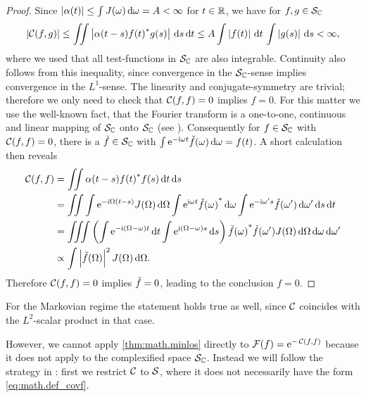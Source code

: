 \begin{lem}
  \label{lem:math.covf_sp}
\end{lem}
\begin{proof}
  Since $\left\vert \alpha(t) \right\vert \le \int J(\omega)\, \mathrm{d}\omega = A < \infty$ for $t\in\mathbb{R}$, we have for $f,g\in\mathcal{S}_{\mathbb{C}}$
  \begin{equation*}
    \abs{\varf(f,g)} \le \iint \abs{\alpha(t-s) \cc{f(t)} g(s)} \dd s \dd t
                     \le A \int\abs{f(t)}\dd t \, \int\abs{g(s)}\dd s 
                     < \infty,
  \end{equation*}
  where we used that all test-functions in $\mathcal{S}_{\mathbb{C}}$ are also integrable.
  Continuity also follows from this inequality, since convergence in the $\mathcal{S}_{\mathbb{C}}$-sense implies convergence in the $L^1$-sense.
  The linearity and conjugate-symmetry are trivial; therefore we only need to check that $\varf(f,f)=0$ implies $f=0$.
  For this matter we use the well-known fact, that the Fourier transform is a one-to-one, continuous and linear mapping of $\mathcal{S}_{\mathbb{C}}$ onto $\mathcal{S}_{\mathbb{C}}$ (see \cite[Theorem 7.7]{Ru91_functional_analysis}).
  Consequently for $f\in\mathcal{S}_{\mathbb{C}}$ with $\varf(f,f) = 0$, there is a $\check{f}\in\mathcal{S}_{\mathbb{C}}$ with $\int\exp[-\ii\omega t]\ift{f}(\omega)\dd\omega = f(t)$.
  A short calculation then reveals
  \begin{align*}
    \varf(f,f) & = \iint \alpha(t-s) \cc{f(t)} f(s) \dd t \dd s \\
               & = \iint  \int\exp[-\ii \Omega (t-s)]J(\Omega)\dd\Omega  \int\exp[\ii\omega t]\cc{\ift{f}(\omega)}\dd\omega  \int\exp[-\ii\omega' s]\ift{f}(\omega') \dd\omega'  \dd s \dd t \\
               & = \iiint \left(   \int \exp[-\ii(\Omega - \omega)t] \dd t  \int \exp[\ii(\Omega - \omega)s] \dd s  \right) \cc{\ift{f}(\omega)}\ift{f}(\omega') J(\Omega) \dd\Omega \dd\omega \dd\omega' \\
               & \propto \int \abs{\ift{f}(\Omega)}^2 J(\Omega) \dd\Omega.
  \end{align*}
  Therefore $\varf(f,f)=0$ implies $\check{f}=0$, leading to the conclusion $f=0$.
\end{proof}
\begin{rem}
  For the Markovian regime the statement holds true as well, since $\varf$ coincides with the $L^2$-scalar product in that case.\\
\end{rem}

However, we cannot apply \autoref{thm:math.minlos} directly to $\CHF(f)=\exp[-\, \varf(f,f)]$ because it does not apply to the complexified space $\mathcal{S}_{\mathbb{C}}$.
Instead we will follow the strategy in \cite{Hi80_brownian_motion}: first we restrict $\varf$ to $\mathcal{S}$, where it does not necessarily have the form \eqref{eq:math.def_covf}.



